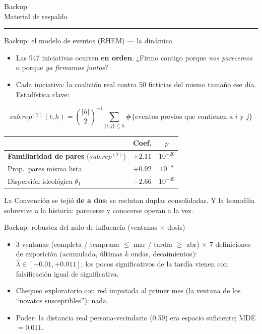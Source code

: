 \documentclass[aspectratio=169,11pt]{beamer}
\newcommand{\emphr}[1]{{\color{ndreddark}\textbf{#1}}}
\newcommand{\nota}[1]{{\footnotesize\color{ndgray} #1}}
\newcommand{\sectionslide}[2]{%
  \begin{frame}[plain]
    \vfill
    \begin{center}
      {\footnotesize\color{ndgray} #1}\\[6pt]
      {\Large #2}\\[2pt]
      {\color{ndred}\rule{0.30\textwidth}{1.1pt}}
    \end{center}
    \vfill
  \end{frame}}
\begin{document}
\sectionslide{Backup}{Material de respaldo}

\begin{frame}{Backup: el modelo de eventos (RHEM) — la dinámica}
\begin{itemize}
  \item Las 947 iniciativas ocurren \emphr{en orden}. ¿Firmo contigo porque \emph{nos parecemos} o porque \emph{ya firmamos juntos}?
  \item Cada iniciativa: la coalición real contra 50 ficticias del mismo tamaño ese día. Estadística clave:
\end{itemize}
$$sub.rep^{(2)}(t,h) = \binom{|h|}{2}^{-1} \sum_{\{i,j\} \subseteq h} \#\{\text{eventos previos que contienen a } i \text{ y } j\}$$
\begin{center}\small
\begin{tabular}{lcc}
\toprule
 & Coef. & $p$ \\
\midrule
\emphr{Familiaridad de pares} ($sub.rep^{(2)}$) & $+2.11$ & $10^{-20}$ \\
Prop.\ pares misma lista & $+0.92$ & $10^{-8}$ \\
Dispersión ideológica $\theta_1$ & $-2.66$ & $10^{-39}$ \\
\bottomrule
\end{tabular}
\end{center}
\vspace{0.1cm}
\nota{La Convención se tejió \emphr{de a dos}: se reclutan duplas consolidadas. Y la homofilia sobrevive a la historia: parecerse y conocerse operan a la vez.}
\end{frame}

\begin{frame}{Backup: robustez del nulo de influencia (ventanas $\times$ dosis)}
\begin{itemize}
  \item 3 ventanas (completa / temprana $\leq$ mar / tardía $\geq$ abr) $\times$ 7 definiciones de exposición (acumulada, últimas $k$ ondas, decaimientos): $\hat\lambda \in [-0.01, +0.011]$; los pocos significativos de la tardía vienen con falsificación igual de significativa.
  \item Chequeo exploratorio con red imputada al primer mes (la ventana de los ``novatos susceptibles''): nada.
  \item Poder: la distancia real persona-vecindario (0.59) era espacio suficiente; MDE $= 0.011$.
\end{itemize}
\end{frame}
\end{document}
